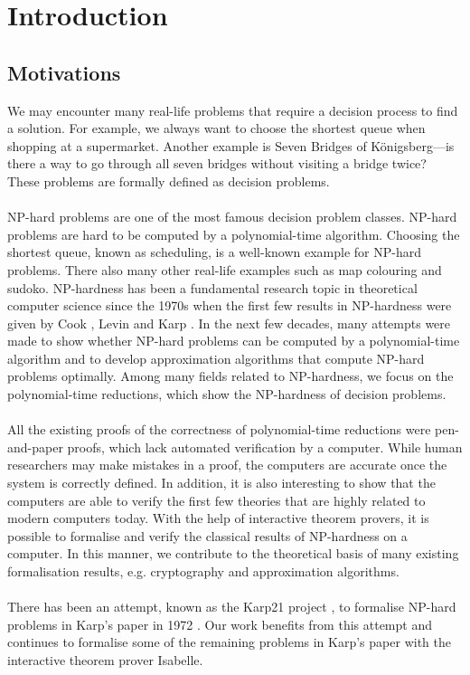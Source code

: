 \chapter{Introduction}\label{chapter:introduction}
\section*{Motivations}
We may encounter many real-life problems that require a decision process to find a solution. 
For example, we always want to choose the shortest queue when shopping at a supermarket. 
Another example is Seven Bridges of Königsberg---is there a way to go through all seven bridges 
without visiting a bridge twice? These problems are formally defined as decision problems.\\\\
NP-hard problems are one of the most famous decision problem classes.
NP-hard problems are hard to be computed by a polynomial-time algorithm. Choosing the shortest queue, 
known as scheduling, is a well-known example for NP-hard problems. There also many other real-life examples
such as map colouring and sudoko.
NP-hardness has been a fundamental research topic in theoretical computer science since the 1970s
when the first few results in NP-hardness were given by Cook \cite{cook2023complexity}, Levin \cite{levin1973universal} 
and Karp \cite{karp2010reducibility}. 
In the next few decades, many attempts were made to show whether NP-hard problems can be computed by a polynomial-time algorithm and to develop approximation algorithms that compute NP-hard problems optimally. 
Among many fields related to NP-hardness, we focus on the polynomial-time reductions, which show the NP-hardness of decision problems. \\\\
All the existing proofs of the correctness of polynomial-time reductions were pen-and-paper proofs, 
which lack automated verification by a computer. 
While human researchers may make mistakes in a proof, the computers are accurate once the system is correctly defined. In addition, 
it is also interesting to show that the computers are able to verify the first few theories that are highly related to modern computers today.
With the help of interactive theorem provers, 
it is possible to formalise and verify the classical results of NP-hardness on a computer.
In this manner, we contribute to the theoretical basis of many existing formalisation results, 
e.g. cryptography and approximation algorithms. \\\\ 
There has been an attempt, known as the Karp21 project \cite{polyred}, to formalise NP-hard problems in Karp's paper in 1972 \cite{karp2010reducibility}. 
Our work benefits from this attempt and continues to formalise some of the remaining problems in Karp's paper 
with the interactive theorem prover Isabelle. 

